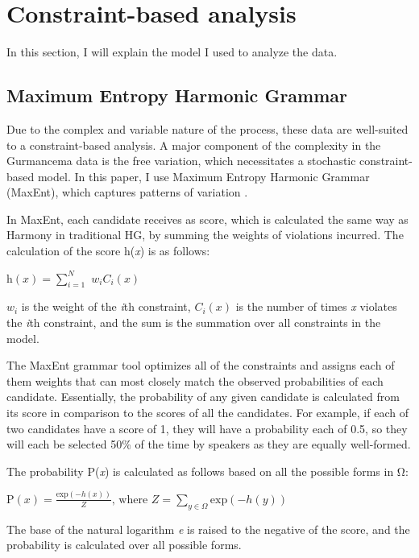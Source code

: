 \documentclass[output=paper,newtxmath,modfonts,nonflat,draftmode]{langsci/langscibook}
\begin{document}
\section{Constraint-based analysis}\label{sec:baird:5}
In this section, I will explain the model I used to analyze the data. 

\subsection{Maximum Entropy Harmonic Grammar}

Due to the complex and variable nature of the process, these data are well-suited to a constraint-based analysis. A major component of the complexity in the Gurmancema data is the free variation, which necessitates a stochastic constraint-based model. In this paper, I use Maximum Entropy Harmonic Grammar (MaxEnt), which captures patterns of variation \citep{GoldwaterJohnson2003,HayesWilson2008}. 
	 
In MaxEnt, each candidate receives as score, which is calculated the same way as Harmony in traditional HG, by summing the weights of violations incurred. The calculation of the score h(\textit{x}) is as follows: 

\ea
$ \mathrm{h}(x) = \sum_{\textit{i}=1}^{\textit{N}}$ ${w_i}{C_i}(x)$

\z

${w_i}$ is the weight of the \textit{i}th constraint, ${C_i}(x)$ is the number of times \textit{x} violates the \textit{i}th constraint, and the sum is the summation over all constraints in the model.  

The MaxEnt grammar tool \citep{WilsonEtAl2009} optimizes all of the constraints and assigns each of them weights that can most closely match the observed probabilities of each candidate. Essentially, the probability of any given candidate is calculated from its score in comparison to the scores of all the candidates. For example, if each of two candidates have a score of 1, they will have a probability each of 0.5, so they will each be selected 50\% of the time by speakers as they are equally well-formed.

The probability P(\textit{x}) is calculated as follows based on all the possible forms in Ω:

\ea 
$ \mathrm{P}(x) = \frac{\mathrm{exp}(-h(x))}{Z}\text{, where } Z = \sum_{y\in \mathrm{\varOmega}} \mathrm{exp}(-h(y))$  
\z

The base of the natural logarithm \textit{e} is raised to the negative of the score, and the probability is calculated over all possible forms. 
\end{document}
